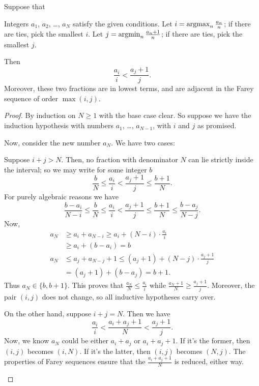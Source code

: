 \documentclass[11pt]{scrartcl}
\begin{document}
\begin{claim*}
	Suppose that
	\begin{itemize}
		\ii Integers $a_1$, $a_2$, \dots, $a_N$ satisfy the given conditions.
		\ii Let $i = \operatorname*{arg max}_n \frac{a_n}{n}$;
		if there are ties, pick the smallest $i$.
		\ii Let $j = \operatorname*{arg min}_n \frac{a_n+1}{n}$;
		if there are ties, pick the smallest $j$.
	\end{itemize}
	Then \[ \frac{a_i}{i} < \frac{a_j+1}{j}. \]
	Moreover, these two fractions are in lowest terms,
	and are adjacent in the Farey sequence of order $\max(i,j)$.
\end{claim*}
\begin{proof}
	By induction on $N \ge 1$ with the base case clear.
	So suppose we have the induction hypothesis
	with numbers $a_1$, \dots, $a_{N-1}$,
	with $i$ and $j$ as promised.

	Now, consider the new number $a_N$.
	We have two cases:
	\begin{itemize}
		\ii Suppose $i+j > N$.
		Then, no fraction with denominator $N$
		can lie strictly inside the interval;
		so we may write for some integer $b$
		\[ \frac bN \le \frac{a_i}{i}
			< \frac{a_j+1}{j} \le \frac{b+1}{N}. \]
		For purely algebraic reasons we have
		\[ \frac{b-a_i}{N-i} \le \frac bN \le \frac{a_i}{i}
			< \frac{a_j+1}{j} \le \frac{b+1}{N}
			\le \frac{b-a_j}{N-j}. \]
		Now,
		\begin{align*}
			a_N &\ge a_i + a_{N-i}
				\ge a_i + (N-i) \cdot \frac{a_i}{i} \\
			&\ge a_i + (b-a_i) = b \\
			a_N &\le a_j + a_{N-j} + 1 
				\le (a_j+1) + (N-j) \cdot \frac{a_j+1}{j} \\
			&= (a_j+1) + (b-a_j) = b+1.
		\end{align*}
		Thus $a_N \in \{b,b+1\}$.
		This proves that $\frac{a_N}{N} \le \frac{a_i}{i}$
		while $\frac{a_N+1}{N} \ge \frac{a_j+1}{j}$.
		Moreover, the pair $(i,j)$ does not change,
		so all inductive hypotheses carry over.

		\ii On the other hand, suppose $i+j = N$.
		Then we have
		\[ \frac{a_i}{i} < \frac{a_i + a_j + 1}{N} < \frac{a_j+1}{j}.  \]
		Now, we know $a_N$ could be either $a_i + a_j$ or $a_i + a_j + 1$.
		If it's the former, then $(i,j)$ becomes $(i,N)$.
		If it's the latter, then $(i,j)$ becomes $(N,j)$.
		The properties of Farey sequences ensure that
		the $\frac{a_i + a_j + 1}{N}$ is reduced, either way.
	\end{itemize}
\end{proof}
\end{document}
